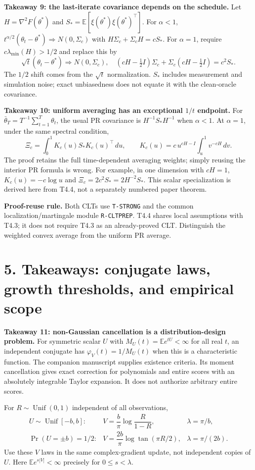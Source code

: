 \documentclass[11pt]{article}
\newcommand{\E}{\mathbb E}\newcommand{\R}{\mathbb R}\newcommand{\C}{\mathbb C}
\newcommand{\ID}[1]{\texttt{#1}}
\begin{document}
\textbf{Takeaway 9: the last-iterate covariance depends on the schedule.}
Let $H=\nabla^2F(\theta^*)$ and $S_*=\E[\xi(\theta^*)\xi(\theta^*)^\top]$.
For $\alpha<1$, $t^{\alpha/2}(\theta_t-\theta^*)\Rightarrow N(0,\Sigma_c)$ with
$H\Sigma_c+\Sigma_cH=cS_*$. For $\alpha=1$, require $c\lambda_{\min}(H)>1/2$ and replace this by
\[
\sqrt t(\theta_t-\theta^*)\Rightarrow N(0,\Sigma_c),\quad
(cH-\tfrac12I)\Sigma_c+\Sigma_c(cH-\tfrac12I)=c^2S_*.
\]
The $1/2$ shift comes from the $\sqrt t$ normalization. $S_*$ includes measurement and simulation noise; exact unbiasedness does not equate it with the clean-oracle covariance.

\textbf{Takeaway 10: uniform averaging has an exceptional $1/t$ endpoint.}
For $\bar\theta_T=T^{-1}\sum_{t=1}^T\theta_t$, the usual PR covariance is
$H^{-1}S_*H^{-1}$ when $\alpha<1$. At $\alpha=1$, under the same spectral condition,
\[
\Xi_c=\int_0^1K_c(u)S_*K_c(u)^\top\,du,
\qquad K_c(u)=c\,u^{cH-I}\int_u^1v^{-cH}\,dv.
\]
The proof retains the full time-dependent averaging weights; simply reusing the interior PR formula is wrong. For example, in one dimension with $cH=1$, $K_c(u)=-c\log u$ and $\Xi_c=2c^2S_*=2H^{-2}S_*$.
This scalar specialization is derived here from T4.4, not a separately numbered paper theorem.

\textbf{Proof-reuse rule.} Both CLTs use \ID{T-STRONG} and the common localization/martingale module \ID{R-CLTPREP}. T4.4 shares local assumptions with T4.3; it does not require T4.3 as an already-proved CLT. Distinguish the weighted convex average from the uniform PR average.

\clearpage
\section*{5. Takeaways: conjugate laws, growth thresholds, and empirical scope}
\textbf{Takeaway 11: non-Gaussian cancellation is a distribution-design problem.}
For symmetric scalar $U$ with $M_U(t)=\E e^{tU}<\infty$ for all real $t$, an independent conjugate has
$\varphi_V(t)=1/M_U(t)$ when this is a characteristic function. The companion manuscript supplies existence criteria. Its moment cancellation gives exact correction for polynomials and entire scores with an absolutely integrable Taylor expansion. It does not authorize arbitrary entire scores.

For $R\sim\operatorname{Unif}(0,1)$ independent of all observations,
\[
\begin{array}{lll}
U\sim\operatorname{Unif}[-b,b]:&
V=\dfrac b\pi\log\dfrac R{1-R},& \lambda=\pi/b,\\[9pt]
\Pr(U=\pm b)=1/2:&
V=\dfrac{2b}\pi\log\tan(\pi R/2),&\lambda=\pi/(2b).
\end{array}
\]
Use these $V$ laws in the same complex-gradient update, not independent copies of $U$.
Here $\E e^{s|V|}<\infty$ precisely for $0\le s<\lambda$.
\end{document}
